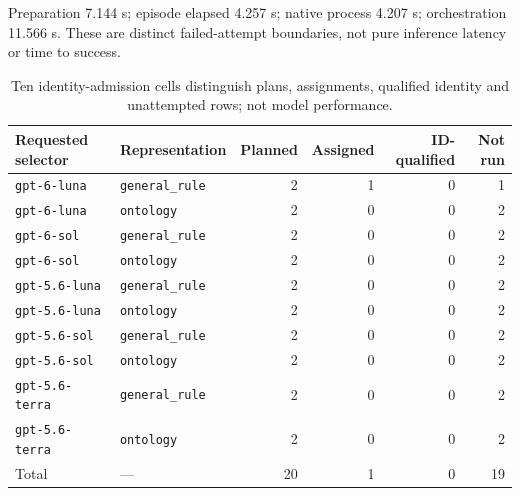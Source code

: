 Preparation 7.144 s; episode elapsed 4.257 s; native process 4.207 s; orchestration 11.566 s. These are distinct failed-attempt boundaries, not pure inference latency or time to success.
\begin{table}[!ht]
\centering
\setlength{\tabcolsep}{4pt}
\renewcommand{\arraystretch}{1.20}
\caption{Ten identity-admission cells distinguish plans, assignments, qualified identity and unattempted rows; not model performance.}
\label{tab:runtime-identity-admission}
\begin{tabular}{llrrrr}
\toprule
Requested selector & Representation & Planned & Assigned & ID-qualified & Not run \\
\midrule
\texttt{gpt-6-luna} & \texttt{general\_rule} & 2 & 1 & 0 & 1 \\
\texttt{gpt-6-luna} & \texttt{ontology} & 2 & 0 & 0 & 2 \\
\texttt{gpt-6-sol} & \texttt{general\_rule} & 2 & 0 & 0 & 2 \\
\texttt{gpt-6-sol} & \texttt{ontology} & 2 & 0 & 0 & 2 \\
\texttt{gpt-5.6-luna} & \texttt{general\_rule} & 2 & 0 & 0 & 2 \\
\texttt{gpt-5.6-luna} & \texttt{ontology} & 2 & 0 & 0 & 2 \\
\texttt{gpt-5.6-sol} & \texttt{general\_rule} & 2 & 0 & 0 & 2 \\
\texttt{gpt-5.6-sol} & \texttt{ontology} & 2 & 0 & 0 & 2 \\
\texttt{gpt-5.6-terra} & \texttt{general\_rule} & 2 & 0 & 0 & 2 \\
\texttt{gpt-5.6-terra} & \texttt{ontology} & 2 & 0 & 0 & 2 \\
\midrule
Total & --- & 20 & 1 & 0 & 19 \\
\bottomrule
\end{tabular}
\end{table}
